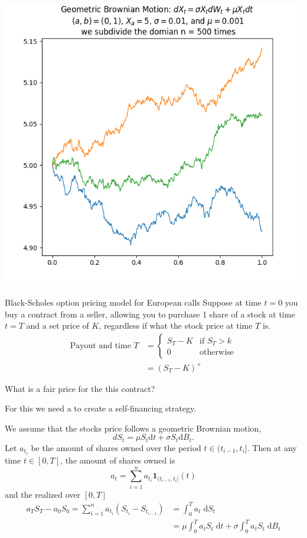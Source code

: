 \documentclass{beamer}%
\numberwithin{equation}{section}
\newcommand{\ud}{\ensuremath{\mathrm{d} }}
\begin{document}
	\begin{frame}
		\begin{center}
			\includegraphics[scale=.64]{geometricbmotion.png}
		\end{center}
	\end{frame}
	
	\begin{frame}{Black-Scholes option pricing model for European calls}
		Suppose at time $t=0$ you buy a contract from a seller, allowing you to purchase 1 share of a stock at time $t=T$ and a set price of $K$, regardless if what the stock price at time $T$ is. 
		\begin{align*} 
		\text{Payout and time $T$} &=
		\begin{cases}
		S_T - K & \text{if } S_T > k \\
		0 & \text{otherwise}
		\end{cases} \\
		&= (S_T - K)^+
		\end{align*}
		
		What is a fair price for the this contract? 
		
		For this we need a to create a self-financing strategy.
	\end{frame}
	
	\begin{frame}
		We assume that the stocks price follows a geometric Brownian motion,
		\[
		dS_t = \mu S_t \ud t + \sigma S_t \ud B_t.
		\]
		Let $a_{t_{i}}$ be the amount of shares owned over the period $t \in (t_{i-1}, t_i]$. Then at any time $t \in [0,T]$, the amount of shares owned is 
		\[
		a_t = \sum_{i=1}^n a_{t_i} \textbf{1}_{(t_{i-1}, t_i]}(t)
		\]
		and the realized over $[0,T]$ 
		\begin{align*}
		a_TS_T - a_0S_0 = \sum_{i=1}^n a_{t_i} (S_{t_{i}} - S_{t_{i-1}}) &= \int_0^T a_t \; \ud S_t \\
		&= \mu \int_0^T a_t S_t \; \ud t + \sigma \int_0^T a_t S_t \; \ud B_t
		\end{align*}
	\end{frame}
	
\end{document}
